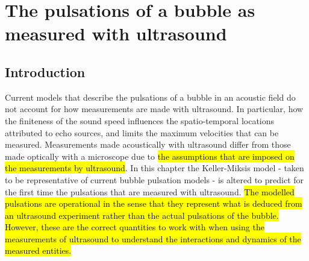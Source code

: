 
\chapter{The pulsations of a bubble as measured with  ultrasound}\label{ch:measurement}


\section{Introduction}\label{sec:measurement:introduction}

Current models that describe the pulsations of a bubble in an acoustic field do not 
account for how measurements are made with ultrasound.
In particular, how the finiteness of the sound speed influences the spatio-temporal locations attributed to echo sources,
and limits the maximum velocities that can be measured.
Measurements made acoustically with ultrasound differ from those
made optically with a microscope due to
\hl{the assumptions that are imposed on the measurements by ultrasound}.
In this chapter the Keller-Miksis model 
- taken to be representative of current bubble pulsation models -
is altered to predict for the first time the pulsations that are  measured with ultrasound.
\hl{
  The modelled pulsations are operational in the sense that they represent what is deduced from an ultrasound experiment
  rather than the actual pulsations of the bubble.
  However, these are the correct quantities to work with when using the measurements of ultrasound
  to understand the interactions and dynamics of the measured entities.
}


